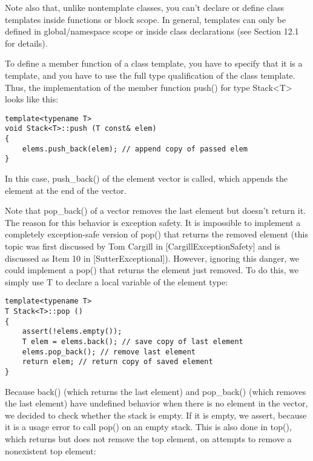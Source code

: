 Note also that, unlike nontemplate classes, you can’t declare or define class templates inside functions or block scope. In general, templates can only be defined in global/namespace scope or inside class declarations (see Section 12.1 for details).


To define a member function of a class template, you have to specify that it is a template, and you have to use the full type qualification of the class template. Thus, the implementation of the member function push() for type Stack<T> looks like this:

\begin{lstlisting}[style=styleCXX]
template<typename T>
void Stack<T>::push (T const& elem)
{
	elems.push_back(elem); // append copy of passed elem
}
\end{lstlisting}

In this case, push\_back() of the element vector is called, which appends the element at the end of the vector.

Note that pop\_back() of a vector removes the last element but doesn’t return it. The reason for this behavior is exception safety. It is impossible to implement a completely exception-safe version of pop() that returns the removed element (this topic was first discussed by Tom Cargill in [CargillExceptionSafety] and is discussed as Item 10 in [SutterExceptional]). However, ignoring this danger, we could implement a pop() that returns the element just removed. To do this, we simply use T to declare a local variable of the element type:

\begin{lstlisting}[style=styleCXX]
template<typename T>
T Stack<T>::pop ()
{
	assert(!elems.empty());
	T elem = elems.back(); // save copy of last element
	elems.pop_back(); // remove last element
	return elem; // return copy of saved element
}
\end{lstlisting}

Because back() (which returns the last element) and pop\_back() (which removes the last element) have undefined behavior when there is no element in the vector, we decided to check whether the stack is empty. If it is empty, we assert, because it is a usage error to call pop() on an empty stack. This is also done in top(), which returns but does not remove the top element, on attempts to remove a nonexistent top element:

